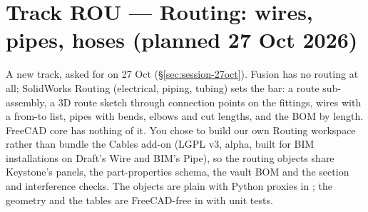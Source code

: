 \section{Track ROU --- Routing: wires, pipes, hoses (planned 27 Oct 2026)}\label{sec:rou}

A new track, asked for on 27 Oct (\S\ref{sec:session-27oct}). Fusion has no routing at all; SolidWorks Routing
(electrical, piping, tubing) sets the bar: a route sub-assembly, a 3D route sketch through connection points on
the fittings, wires with a from-to list, pipes with bends, elbows and cut lengths, and the BOM by length.
FreeCAD core has nothing of it. You chose to build our own Routing workspace rather than bundle the Cables
add-on (LGPL v3, alpha, built for BIM installations on Draft's Wire and BIM's Pipe), so the routing objects share
Keystone's panels, the part-properties schema, the vault BOM and the section and interference checks. The
objects are plain  with Python proxies in ; the geometry
and the tables are FreeCAD-free in  with unit tests.

